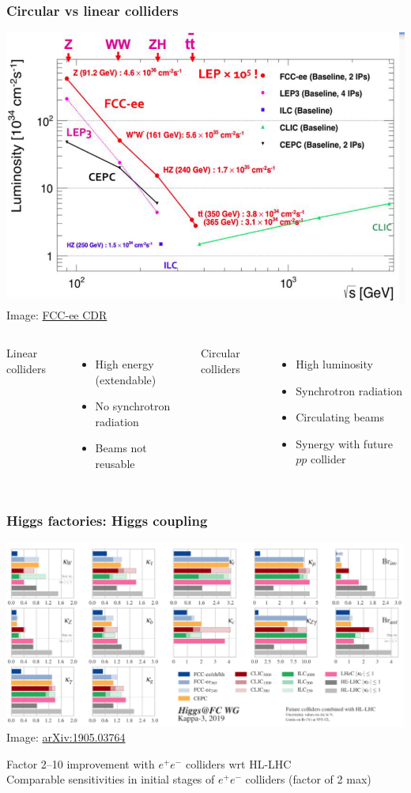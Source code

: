 \documentclass[aspectratio=169]{beamer}
\newcommand{\bluetext}[1]{%
  \textcolor{myBlue}{#1}
}
\begin{document}
\begin{frame}
  \frametitle{Circular vs linear colliders}

  \begin{center}
    \includegraphics[width=0.4\linewidth]{figures/Luminosity_vs_energy_v1.png}\\
     \tiny{Image: \href{https://cds.cern.ch/record/2651299?ln=en}{FCC-ee CDR}}
  \end{center}
  \vspace{1ex}

  \begin{columns}
     \bluetext{Linear colliders}
     \begin{itemize}
     \item High energy (extendable)
     \item No synchrotron radiation
     \item Beams not reusable
     \end{itemize}

     \bluetext{Circular colliders}
     \begin{itemize}
     \item High luminosity
     \item Synchrotron radiation
     \item Circulating beams
     \item Synergy with future $pp$ collider
     \end{itemize}
   \end{columns}
\end{frame}


\begin{frame}
  \frametitle{Higgs factories: Higgs coupling}
  \begin{center}
    \includegraphics[width=0.85\linewidth]{figures/kappa.png}\\
    \tiny{Image: \href{https://arxiv.org/abs/1905.03764}{arXiv:1905.03764}}
  \end{center}
  \pause%

  Factor 2--10 improvement with $e^+e^-$ colliders wrt HL-LHC\\
  Comparable sensitivities in initial stages of $e^+e^-$ colliders (factor of 2 max)
\end{frame}
\end{document}
